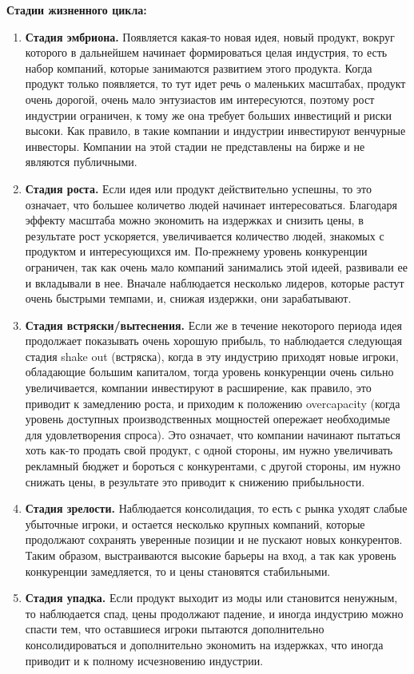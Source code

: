 \documentclass{article}
\begin{document}
	\textbf{Стадии жизненного цикла:}
	\begin{enumerate}
		
	\item \textbf{Стадия эмбриона.} Появляется какая-то новая идея, новый продукт, вокруг которого в дальнейшем начинает формироваться целая индустрия, то есть набор компаний, которые занимаются развитием этого продукта. Когда продукт только появляется, то тут идет речь о маленьких масштабах, продукт очень дорогой, очень мало энтузиастов им интересуются, поэтому рост индустрии ограничен, к тому же она требует больших инвестиций и риски высоки. Как правило, в такие компании и индустрии инвестируют венчурные инвесторы. Компании на этой стадии не представлены на бирже и не являются публичными. 
	\item \textbf{Стадия роста.} Если идея или продукт действительно успешны, то это означает, что большее количетво людей начинает интересоваться. Благодаря эффекту масштаба можно экономить на издержках и снизить цены, в результате рост ускоряется, увеличивается количество людей, знакомых с продуктом и интересующихся им. По-прежнему уровень конкуренции ограничен, так как очень мало компаний занимались этой идеей, развивали ее и вкладывали в нее. Вначале наблюдается несколько лидеров, которые растут очень быстрыми темпами, и, снижая издержки, они зарабатывают.
	\item \textbf{Стадия встряски/вытеснения.} Если же в течение некоторого периода идея продолжает показывать очень хорошую прибыль, то наблюдается следующая стадия shake out (встряска), когда в эту индустрию приходят новые игроки, обладающие большим капиталом, тогда уровень конкуренции очень сильно увеличивается, компании инвестируют в расширение, как правило, это приводит к замедлению роста, и приходим к положению overcapacity (когда уровень доступных производственных мощностей опережает необходимые для удовлетворения спроса). Это означает, что компании начинают пытаться хоть как-то продать свой продукт, с одной стороны, им нужно увеличивать рекламный бюджет и бороться с конкурентами, с другой стороны, им нужно снижать цены, в результате это приводит к снижению прибыльности.
	\item \textbf{Стадия зрелости.} Наблюдается консолидация, то есть с рынка уходят слабые убыточные игроки, и остается несколько крупных компаний, которые продолжают сохранять уверенные позиции и не пускают  новых конкурентов. Таким образом, выстраиваются высокие барьеры на вход, а так как уровень конкуренции замедляется, то и цены становятся стабильными.
	\item \textbf{Стадия упадка.} Если продукт выходит из моды или становится ненужным, то наблюдается спад, цены продолжают падение, и иногда индустрию можно спасти тем, что оставшиеся игроки пытаются дополнительно консолидироваться и дополнительно экономить на издержках, что иногда приводит и к полному исчезновению индустрии. 
	\end{enumerate}
\end{document}
